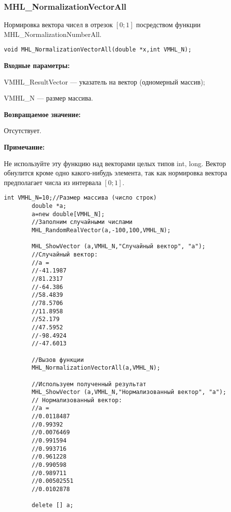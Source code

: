 \documentclass[a4paper,12pt]{article}
\begin{document}
\subsubsection{MHL\_NormalizationVectorAll}\label{MHL_NormalizationVectorAll}

Нормировка вектора чисел в отрезок $[0;1]$ посредством функции MHL\_NormalizationNumberAll.


\begin{lstlisting}[label=code_syntax_MHL_NormalizationVectorAll,caption=Синтаксис]
void MHL_NormalizationVectorAll(double *x,int VMHL_N);
\end{lstlisting}

\textbf{Входные параметры:}

 VMHL\_ResultVector --- указатель на вектор (одномерный массив);
 
 VMHL\_N --- размер массива.

\textbf{Возвращаемое значение:} 
 
Отсутствует.

\textbf{Примечание:} 

Не используйте эту функцию над векторами целых типов int, long. Вектор обнулится кроме одно какого-нибудь элемента, так как нормировка вектора предполагает числа из интервала $[0;1]$.


\begin{lstlisting}[label=code_use_MHL_NormalizationVectorAll,caption=Пример использования]
        int VMHL_N=10;//Размер массива (число строк)
        double *a;
        a=new double[VMHL_N];
        //Заполним случайными числами
        MHL_RandomRealVector(a,-100,100,VMHL_N);

        MHL_ShowVector (a,VMHL_N,"Случайный вектор", "a");
        //Случайный вектор:
        //a =
        //-41.1987
        //81.2317
        //-64.386
        //58.4839
        //78.5706
        //11.8958
        //52.179
        //47.5952
        //-98.4924
        //-47.6013

        //Вызов функции
        MHL_NormalizationVectorAll(a,VMHL_N);

        //Используем полученный результат
        MHL_ShowVector (a,VMHL_N,"Нормализованный вектор", "a");
        // Нормализованный вектор:
        //a =
        //0.0118487
        //0.99392
        //0.0076469
        //0.991594
        //0.993716
        //0.961228
        //0.990598
        //0.989711
        //0.00502551
        //0.0102878

        delete [] a;
\end{lstlisting}
\end{document}
